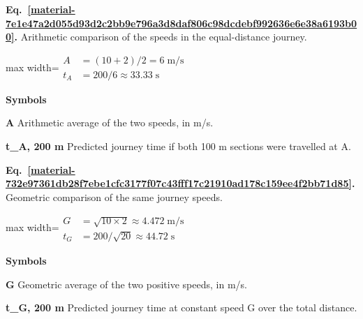 \documentclass[11pt,a4paper]{article}
\begin{document}
\par\medskip
\noindent\begin{minipage}{\linewidth}
\label{material-7e1e47a2d055d93d2c2bb9e796a3d8daf806c98dcdebf992636e6e38a6193b00}
\noindent\textbf{Eq.~\ref*{material-7e1e47a2d055d93d2c2bb9e796a3d8daf806c98dcdebf992636e6e38a6193b00}.} Arithmetic comparison of the speeds in the equal-distance journey.\par\nopagebreak
\begin{center}\begin{adjustbox}{max width=\linewidth}$\displaystyle \begin{aligned}A&=(10+2)/2=6\;\mathrm{m/s}\\t_A&=200/6\approx33.33\;\mathrm{s}\end{aligned}$\end{adjustbox}\end{center}

\par\noindent\textbf{Symbols}

\par\noindent\textbf{A} Arithmetic average of the two speeds, in m/s.

\par\noindent\textbf{t\_A, 200 m} Predicted journey time if both 100 m sections were travelled at A.

\end{minipage}\par
\medskip

\par\medskip
\noindent\begin{minipage}{\linewidth}
\label{material-732e97361db28f7ebe1cfc3177f07c43fff17c21910ad178c159ee4f2bb71d85}
\noindent\textbf{Eq.~\ref*{material-732e97361db28f7ebe1cfc3177f07c43fff17c21910ad178c159ee4f2bb71d85}.} Geometric comparison of the same journey speeds.\par\nopagebreak
\begin{center}\begin{adjustbox}{max width=\linewidth}$\displaystyle \begin{aligned}G&=\sqrt{10\times2}\approx4.472\;\mathrm{m/s}\\t_G&=200/\sqrt{20}\approx44.72\;\mathrm{s}\end{aligned}$\end{adjustbox}\end{center}

\par\noindent\textbf{Symbols}

\par\noindent\textbf{G} Geometric average of the two positive speeds, in m/s.

\par\noindent\textbf{t\_G, 200 m} Predicted journey time at constant speed G over the total distance.

\end{minipage}\par
\medskip
\end{document}
